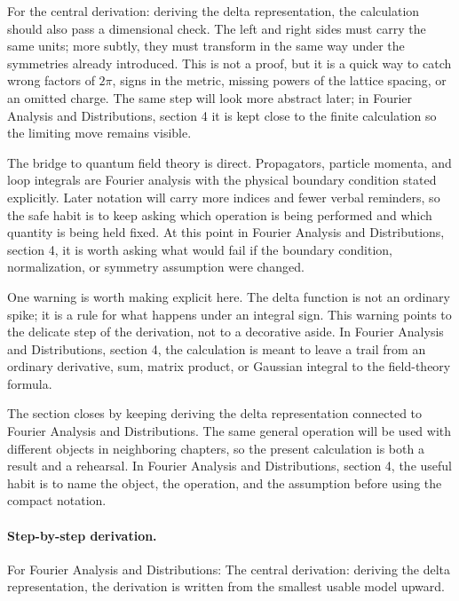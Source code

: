 For the central derivation: deriving the delta representation, the calculation should also pass a dimensional check.  The left and right sides must carry the same units; more subtly, they must transform in the same way under the symmetries already introduced.  This is not a proof, but it is a quick way to catch wrong factors of \(2\pi\), signs in the metric, missing powers of the lattice spacing, or an omitted charge.  The same step will look more abstract later; in Fourier Analysis and Distributions, section 4 it is kept close to the finite calculation so the limiting move remains visible.

The bridge to quantum field theory is direct.  Propagators, particle momenta, and loop integrals are Fourier analysis with the physical boundary condition stated explicitly.  Later notation will carry more indices and fewer verbal reminders, so the safe habit is to keep asking which operation is being performed and which quantity is being held fixed.  At this point in Fourier Analysis and Distributions, section 4, it is worth asking what would fail if the boundary condition, normalization, or symmetry assumption were changed.

One warning is worth making explicit here.  The delta function is not an ordinary spike; it is a rule for what happens under an integral sign.  This warning points to the delicate step of the derivation, not to a decorative aside.  In Fourier Analysis and Distributions, section 4, the calculation is meant to leave a trail from an ordinary derivative, sum, matrix product, or Gaussian integral to the field-theory formula.

The section closes by keeping deriving the delta representation connected to Fourier Analysis and Distributions.  The same general operation will be used with different objects in neighboring chapters, so the present calculation is both a result and a rehearsal.  In Fourier Analysis and Distributions, section 4, the useful habit is to name the object, the operation, and the assumption before using the compact notation.



\paragraph{Step-by-step derivation.}

For Fourier Analysis and Distributions: The central derivation: deriving the delta representation, the derivation is written from the smallest usable model upward.

